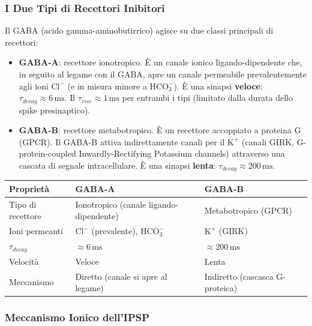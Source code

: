 \subsubsection{I Due Tipi di Recettori Inibitori}

Il GABA (acido gamma-aminobutirrico) agisce su due classi principali di recettori:

\begin{itemize}
    \item \textbf{GABA-A}: recettore ionotropico. È un canale ionico ligando-dipendente che, in seguito al legame con il GABA, apre un canale permeabile prevalentemente agli ioni $\text{Cl}^-$ (e in misura minore a $\text{HCO}_3^-$). È una sinapsi \textbf{veloce}: $\tau_{decay} \approx 6 \, \text{ms}$. Il $\tau_{rise} \approx 1 \, \text{ms}$ per entrambi i tipi (limitato dalla durata dello spike presinaptico).
    \item \textbf{GABA-B}: recettore metabotropico. È un recettore accoppiato a proteina G (GPCR). Il GABA-B attiva indirettamente canali per il $\text{K}^+$ (canali GIRK, G-protein-coupled Inwardly-Rectifying Potassium channels) attraverso una cascata di segnale intracellulare. È una sinapsi \textbf{lenta}: $\tau_{decay} \approx 200 \, \text{ms}$.
\end{itemize}

\begin{table}[htbp]
    \centering
    \renewcommand{\arraystretch}{1.3}
    \begin{tabularx}{\textwidth}{|X|X|X|}
    \hline
    \textbf{Proprietà} & \textbf{GABA-A} & \textbf{GABA-B} \\
    \hline
    Tipo di recettore & Ionotropico (canale ligando-dipendente) & Metabotropico (GPCR) \\
    \hline
    Ioni permeanti & $\text{Cl}^-$ (prevalente), $\text{HCO}_3^-$ & $\text{K}^+$ (GIRK) \\
    \hline
    $\tau_{decay}$ & $\approx 6 \, \text{ms}$ & $\approx 200 \, \text{ms}$ \\
    \hline
    Velocità & Veloce & Lenta \\
    \hline
    Meccanismo & Diretto (canale si apre al legame) & Indiretto (cascasca G-proteica) \\
    \hline
    \end{tabularx}
\end{table}




\subsubsection{Meccanismo Ionico dell'IPSP}

